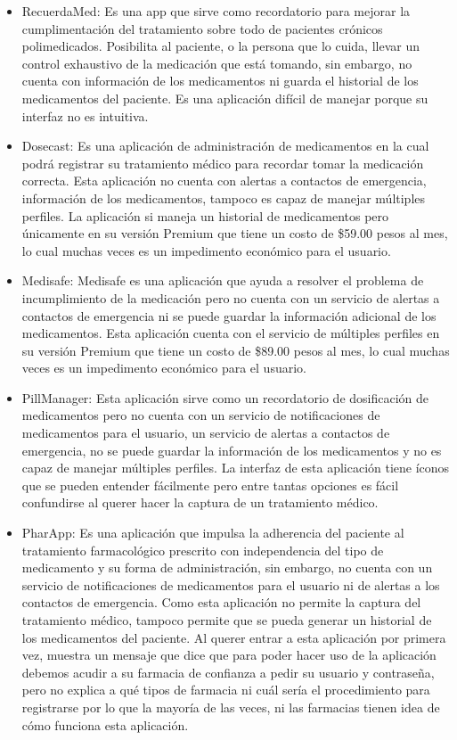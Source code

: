 \begin{itemize}
	\item RecuerdaMed: Es una app que sirve como recordatorio para mejorar la cumplimentación del tratamiento sobre todo de pacientes crónicos polimedicados. Posibilita al paciente, o la persona que lo cuida, llevar un control exhaustivo de la medicación que está tomando, sin embargo, no cuenta con información de los medicamentos ni guarda el historial de los medicamentos del paciente. Es una aplicación difícil de manejar porque su interfaz no es intuitiva.

	\item Dosecast: Es una aplicación de administración de medicamentos en la cual podrá registrar su tratamiento médico para recordar tomar la medicación correcta. Esta aplicación no cuenta con alertas a contactos de emergencia, información de los medicamentos, tampoco es capaz de manejar múltiples perfiles. La aplicación si maneja un historial de medicamentos pero únicamente en su versión Premium que tiene un costo de \$59.00 pesos al mes, lo cual muchas veces es un impedimento económico para el usuario.

	\item Medisafe: Medisafe es una aplicación que ayuda a resolver el problema de incumplimiento de la medicación pero no cuenta con un servicio de alertas a contactos de emergencia ni se puede guardar la información adicional de los medicamentos. Esta aplicación cuenta con el servicio de múltiples perfiles en su versión Premium que tiene un costo de \$89.00 pesos al mes, lo cual muchas veces es un impedimento económico para el usuario.
	
	\item PillManager: Esta aplicación sirve como un recordatorio de dosificación de medicamentos pero no cuenta con un servicio de notificaciones de medicamentos para el usuario, un servicio de alertas a contactos de emergencia, no se puede guardar la información de los medicamentos y no es capaz de manejar múltiples perfiles. La interfaz de esta aplicación tiene íconos que se pueden entender fácilmente pero entre tantas opciones es fácil confundirse al querer hacer la captura de un tratamiento médico.

	\item PharApp: Es una aplicación que impulsa la adherencia del paciente al tratamiento farmacológico prescrito con independencia del tipo de medicamento y su forma de administración, sin embargo, no cuenta con un servicio de notificaciones de medicamentos para el usuario ni de alertas a los contactos de emergencia. Como esta aplicación no permite la captura del tratamiento médico, tampoco permite que se pueda generar un historial de los medicamentos del paciente. Al querer entrar a esta aplicación por primera vez, muestra un mensaje que dice que para poder hacer uso de la aplicación debemos acudir a su farmacia de confianza a pedir su usuario y contraseña, pero no explica a qué tipos de farmacia ni cuál sería el procedimiento para registrarse por lo que la mayoría de las veces, ni las farmacias tienen idea de cómo funciona esta aplicación.
	

\end{itemize}
